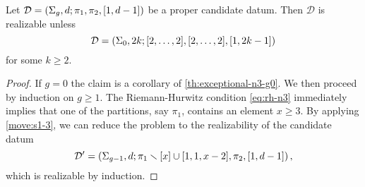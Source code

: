 \documentclass{article}
\begin{document}
\begin{lemma}\label{th:exceptional-n3-s1}
Let $\mathcal{D}=\left(\Sigma_g,d;\pi_1,\pi_2,[1,d-1]\right)$ be a proper candidate datum. Then $\mathcal{D}$ is realizable unless
\[
\mathcal{D}=\left(\Sigma_0,2k;[2,\ldots,2],[2,\ldots,2],[1,2k-1]\right)
\]
for some $k\ge 2$.
\end{lemma}
\begin{proof}
If $g=0$ the claim is a corollary of \cref{th:exceptional-n3-g0}. We then proceed by induction on $g\ge 1$. The Riemann-Hurwitz condition \eqref{eq:rh-n3} immediately implies that one of the partitions, say $\pi_1$, contains an element $x\ge 3$. By applying \cref{move:s1-3}, we can reduce the problem to the realizability of the candidate datum
\[
\mathcal{D}'=\left(\Sigma_{g-1},d;\pi_1\smallsetminus[x]\cup[1,1,x-2],\pi_2,[1,d-1]\right),
\]
which is realizable by induction.
\end{proof}
\end{document}
